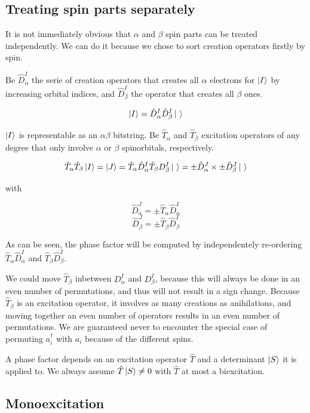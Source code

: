 \subsection{Treating spin parts separately}

It is not immediately obvious that $\alpha$ and $\beta$ spin parts can be treated independently. We can do it because we chose to sort creation operators firstly by spin.

Be $\hat D_\alpha^I$ the serie of creation operators that creates all $\alpha$ electrons for $\ket I$ by increasing orbital indices, and $\hat D_\beta^I$ the operator that creates all $\beta$ ones.

$$\ket I = \hat D_\alpha^I \hat D_\beta^I \ket \ $$


$\ket I$ is representable as an $\alpha \beta$ bitstring. Be $\hat T_\alpha$ and $\hat T_\beta$ excitation operators of any degree that only involve $\alpha$ or $\beta$ spinorbitals, respectively.

$$\hat T_\alpha \hat T_\beta \ket I = \ket J = \hat T_\alpha \hat D_\alpha^I \hat T_\beta D_\beta^I \ket \ = \pm \hat D_\alpha^J \times \pm \hat D_\beta^J \ket \ $$

with

$$\hat D_\alpha^J = \pm \hat T_\alpha \hat D_\alpha^I$$
$$\hat D_\beta^J = \pm \hat T_\beta \hat D_\beta^I$$

As can be seen, the phase factor will be computed by independentely re-ordering $\hat T_\alpha \hat D_\alpha^I$ and $\hat T_\beta \hat D_\beta^I$.

We could move $\hat T_\beta$ inbetween $D_\alpha^I$ and $D_\beta^I$, because this will always be done in an even number of permutations, and thus will not result in a sign change. Because $\hat T_\beta$ is an excitation operator, it involves as many creations as anihilations, and moving together an even number of operators results in an even number of permutations. We are guaranteed never to encounter the special case of permuting $a^\dagger_i$ with $a_i$ because of the different spins.






A phase factor depends on an excitation operator $\hat T$ and a determinant $\ket S$ it is applied to. We always assume $\hat T \ket S \neq 0$ with $\hat T$ at most a biexcitation. 



\subsection{Monoexcitation}

